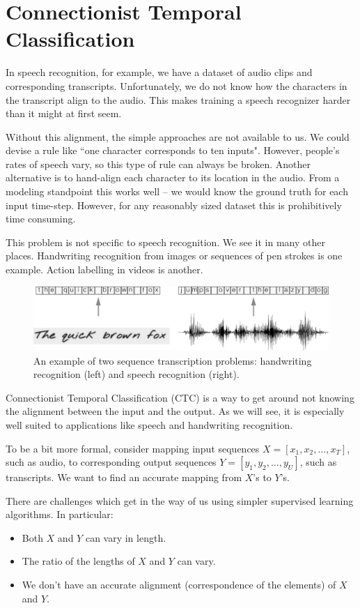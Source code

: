 \section{Connectionist Temporal Classification}

In speech recognition, for example, we have a dataset of audio clips and
corresponding transcripts. Unfortunately, we do not know how the characters in
the transcript align to the audio. This makes training a speech recognizer
harder than it might at first seem.

Without this alignment, the simple approaches are not available to us. We could
devise a rule like ``one character corresponds to ten inputs". However,
people's rates of speech vary, so this type of rule can always be broken.
Another alternative is to hand-align each character to its location in the
audio. From a modeling standpoint this works well -- we would know the ground
truth for each input time-step. However, for any reasonably sized dataset this
is prohibitively time consuming.

This problem is not specific to speech recognition. We see it in many other
places. Handwriting recognition from images or sequences of pen strokes is one
example. Action labelling in videos is another.

\begin{figure}
\centering
\includegraphics[width=\textwidth]{background/figures/asr_hrr.pdf}
\caption{An example of two sequence transcription problems: handwriting
    recognition (left) and speech recognition (right).}
\label{fig:bg:asr_hrr} 
\end{figure}

Connectionist Temporal Classification (CTC) is a way to get around not knowing
the alignment between the input and the output. As we will see, it is
especially well suited to applications like speech and handwriting recognition.

To be a bit more formal, consider mapping input sequences $X = [x_1, x_2,
\ldots, x_T]$, such as audio, to corresponding output sequences $Y = [y_1, y_2,
\ldots, y_U]$, such as transcripts.  We want to find an accurate mapping from
$X$'s to $Y$'s.

There are challenges which get in the way of us using simpler supervised
learning algorithms. In particular:
\begin{itemize}
  \item Both $X$ and $Y$ can vary in length.
  \item The ratio of the lengths of $X$ and $Y$ can vary.
  \item We don't have an accurate alignment (correspondence of the elements) of
  $X$ and $Y$.
\end{itemize}

